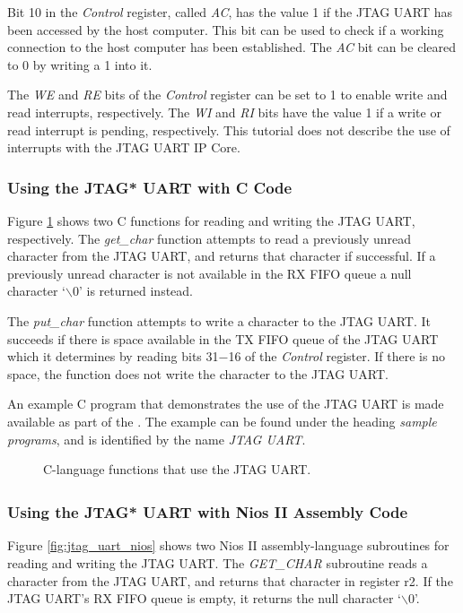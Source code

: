 \documentclass[11pt, twoside, pdftex]{article}
\begin{document}
Bit 10 in the {\it Control} register, called {\it AC}, has the value 1 if the JTAG UART has been
accessed by the host computer. This bit can be used to check if a working connection to
the host computer has been established. The {\it AC} bit can be cleared to 0 by writing a 1
into it. 

The {\it WE} and {\it RE} bits of the {\it Control} register can be set to 1 to enable write and read interrupts, respectively. The {\it WI} and {\it RI} bits have the value 1 if a write or read interrupt is pending, respectively. This tutorial does not describe the use of interrupts with the JTAG UART IP Core.

\subsubsection{Using the JTAG* UART with C Code}

Figure \ref{fig:jtag_uart_c} shows two C functions for reading and writing the JTAG UART, respectively. 
The \textit{get\_char} function attempts to read a previously unread character from the JTAG UART, and returns that character if successful. If a previously unread character is not available in the RX FIFO queue a null character `$\backslash$0' is returned instead. 

The \textit{put\_char} function attempts to write a character to the JTAG UART. It succeeds if there is space available in the TX FIFO queue of the JTAG UART which it determines by reading bits 31$-$16 of the \textit{Control} register. If there is no space, the function does not write the character to the JTAG UART.

An example C program that demonstrates the use of the JTAG UART is made available as part of the  
\productNameMed{}. The example can be found under the heading {\it sample programs}, 
and is identified by the name {\it JTAG UART}.

\begin{figure}[h!]

\caption{C-language functions that use the JTAG UART.}
   \label{fig:jtag_uart_c}
\end{figure}

\subsubsection{Using the JTAG* UART with Nios\textsuperscript{\textregistered} II Assembly Code}

Figure \ref{fig:jtag_uart_nios} shows two Nios II assembly-language subroutines for reading and writing the JTAG UART. 
The \textit{GET\_CHAR} subroutine reads a character from the JTAG UART, and returns that character in register r2. If the JTAG UART's RX FIFO queue is empty, it returns the null character `$\backslash$0'. 
\end{document}
